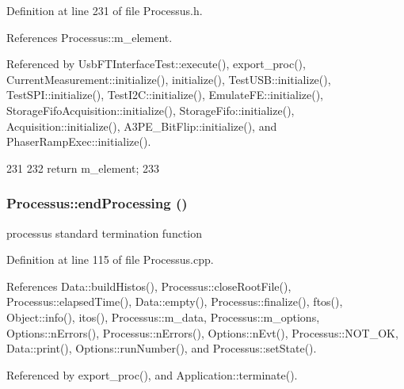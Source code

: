 Definition at line 231 of file Processus.h.

References Processus::m\_\-element.

Referenced by UsbFTInterfaceTest::execute(), export\_\-proc(), CurrentMeasurement::initialize(), initialize(), TestUSB::initialize(), TestSPI::initialize(), TestI2C::initialize(), EmulateFE::initialize(), StorageFifoAcquisition::initialize(), StorageFifo::initialize(), Acquisition::initialize(), A3PE\_\-BitFlip::initialize(), and PhaserRampExec::initialize().


\begin{DoxyCode}
231                       {
232     return m_element;
233   }
\end{DoxyCode}
\hypertarget{classProcessus_a5e4da662989d356b89d490b89c7afbfd}{
\subsubsection[{endProcessing}]{ Processus::endProcessing ()}}
\label{classProcessus_a5e4da662989d356b89d490b89c7afbfd}
processus standard termination function 

Definition at line 115 of file Processus.cpp.

References Data::buildHistos(), Processus::closeRootFile(), Processus::elapsedTime(), Data::empty(), Processus::finalize(), ftos(), Object::info(), itos(), Processus::m\_\-data, Processus::m\_\-options, Options::nErrors(), Processus::nErrors(), Options::nEvt(), Processus::NOT\_\-OK, Data::print(), Options::runNumber(), and Processus::setState().

Referenced by export\_\-proc(), and Application::terminate().



